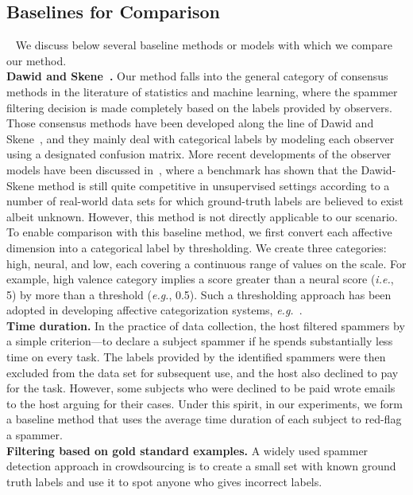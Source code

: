 \documentclass[10pt,journal,letterpaper,compsoc,twoside]{IEEEtran}
\begin{document}
\subsection{Baselines for Comparison}~\label{sec:baseline}
{We discuss below several baseline methods or models with which we compare our method. \\
\textbf{Dawid and Skene~\citep{dawid1979maximum}.} 
Our method falls into the general category of consensus methods in the literature of statistics and machine learning,
where the spammer filtering decision is made completely based on the labels provided by observers. Those consensus methods
have been developed along the line of Dawid and Skene~\citep{dawid1979maximum}, and they mainly deal with categorical labels by
modeling each observer using a designated confusion matrix. More recent developments of the observer models have been 
discussed in~\citep{sheshadri2013square}, where a benchmark has shown that the Dawid-Skene method is still quite
competitive in unsupervised settings according to a number of real-world data sets for which ground-truth labels are believed to exist albeit unknown. However, this method is not directly applicable to our scenario. To enable comparison with this baseline method, 
we first convert each affective dimension into a categorical label by thresholding. 
We create three categories: high, neural, and low, each covering a continuous range of values on the scale. For example, 
high valence category implies a score greater than a neural score ({\it i.e.}, 5) by more than a threshold ({\it e.g.}, 0.5). Such a thresholding approach has 
been adopted in developing affective categorization systems, {\it e.g.}~\citep{datta2006studying,lu2012shape}.\\
\textbf{Time duration.} In the practice of data collection, the host filtered spammers by a simple criterion---to declare a subject spammer if he
spends substantially less time on every task. The labels provided by the identified spammers were then excluded from the data set for subsequent use, and the host also declined to pay for the task.
However, some subjects who were declined to be paid wrote emails to the host arguing for their cases.
Under this spirit, in our experiments, we form a baseline method that uses the average time duration of each subject to red-flag a spammer.\\
\textbf{Filtering based on gold standard examples.} A widely used spammer detection approach in crowdsourcing
is to create a small set with known ground truth labels and use it to spot anyone who gives incorrect labels. 
}
\end{document}

